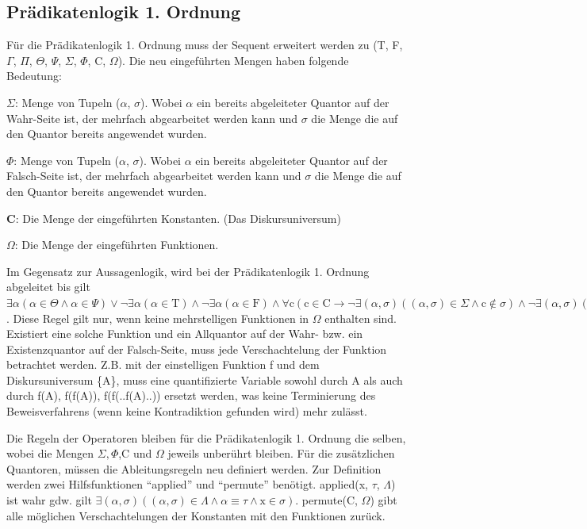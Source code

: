 \subsection{Prädikatenlogik 1. Ordnung}
Für die Prädikatenlogik 1. Ordnung muss der Sequent erweitert werden zu (T, F, $\Gamma$, $\Pi$, $\Theta$, $\Psi$, $\Sigma$, $\Phi$, C, $\Omega$). Die neu eingeführten Mengen haben folgende Bedeutung:
\begin{description}
\item \textbf{$\Sigma$}: Menge von Tupeln ($\alpha$, $\sigma$). Wobei $\alpha$ ein bereits abgeleiteter Quantor auf der Wahr-Seite ist, der mehrfach abgearbeitet werden kann und $\sigma$ die Menge die auf den Quantor bereits angewendet wurden.

\item \textbf{$\Phi$}: Menge von Tupeln ($\alpha$, $\sigma$). Wobei $\alpha$ ein bereits abgeleiteter Quantor auf der Falsch-Seite ist, der mehrfach abgearbeitet werden kann und $\sigma$ die Menge die auf den Quantor bereits angewendet wurden.

\item \textbf{C}: Die Menge der eingeführten Konstanten. (Das Diskursuniversum)

\item \textbf{$\Omega$}: Die Menge der eingeführten Funktionen.
\end{description}

Im Gegensatz zur Aussagenlogik, wird bei der Prädikatenlogik 1. Ordnung abgeleitet bis gilt $\exists\alpha(\alpha\in\Theta\wedge\alpha\in\Psi)\vee\neg\exists\alpha(\alpha\in\textrm{T})\wedge\neg\exists\alpha(\alpha\in\textrm{F})\wedge\forall\textrm{c}(\textrm{c}\in\textrm{C}\rightarrow\neg\exists(\alpha,\sigma)((\alpha,\sigma)\in\Sigma\wedge\textrm{c}\notin\sigma)\wedge\neg\exists(\alpha,\sigma)((\alpha,\sigma)\in\Phi\wedge\textrm{c}\notin\sigma))$. Diese Regel gilt nur, wenn keine mehrstelligen Funktionen in $\Omega$ enthalten sind. Existiert eine solche Funktion und ein Allquantor auf der Wahr- bzw. ein Existenzquantor auf der Falsch-Seite, muss jede Verschachtelung der Funktion betrachtet werden. Z.B. mit der einstelligen Funktion f und dem Diskursuniversum \{A\}, muss eine quantifizierte Variable sowohl durch A als auch durch f(A), f(f(A)), f(f(..f(A)..)) ersetzt werden, was keine Terminierung des Beweisverfahrens (wenn keine Kontradiktion gefunden wird) mehr zulässt.

Die Regeln der Operatoren bleiben für die Prädikatenlogik 1. Ordnung die selben, wobei die Mengen $\Sigma,\Phi$,C und $\Omega$ jeweils unberührt bleiben. Für die zusätzlichen Quantoren, müssen die Ableitungsregeln neu definiert werden. Zur Definition werden zwei Hilfsfunktionen ``applied'' und ``permute'' benötigt. applied(x, $\tau$, $\Lambda$) ist wahr gdw. gilt $\exists(\alpha,\sigma)((\alpha,\sigma)\in\Lambda\wedge\alpha\equiv\tau\wedge\textrm{x}\in\sigma)$. permute(C, $\Omega$) gibt alle möglichen Verschachtelungen der Konstanten mit den Funktionen zurück.

